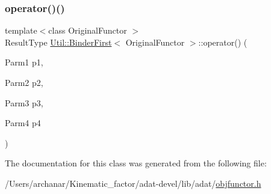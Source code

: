 \mbox{\label{classUtil_1_1BinderFirst_ae11ec27f2d62ef1594ef033d8a9f3135}} 
\subsubsection{\texorpdfstring{operator()()}{operator()()}\hspace{0.1cm}{\footnotesize\ttfamily [15/15]}}
{\footnotesize\ttfamily template$<$class Original\+Functor $>$ \\
Result\+Type \mbox{\hyperlink{classUtil_1_1BinderFirst}{Util\+::\+Binder\+First}}$<$ Original\+Functor $>$\+::operator() (\begin{DoxyParamCaption}\item[{Parm1}]{p1,  }\item[{Parm2}]{p2,  }\item[{Parm3}]{p3,  }\item[{Parm4}]{p4 }\end{DoxyParamCaption})\hspace{0.3cm}{\ttfamily [inline]}}



The documentation for this class was generated from the following file\+:\begin{DoxyCompactItemize}
\item 
/\+Users/archanar/\+Kinematic\+\_\+factor/adat-\/devel/lib/adat/\mbox{\hyperlink{adat-devel_2lib_2adat_2objfunctor_8h}{objfunctor.\+h}}\end{DoxyCompactItemize}
